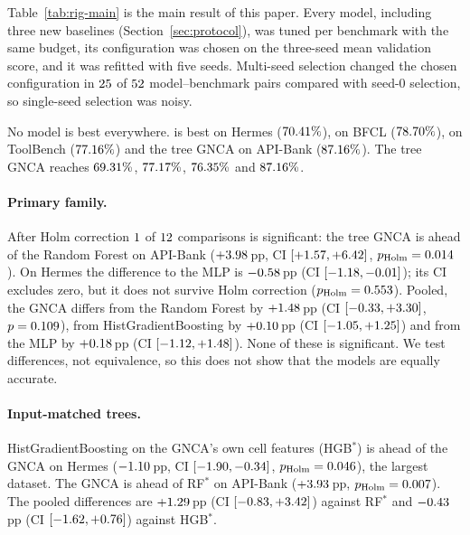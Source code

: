 \documentclass[10pt]{article}
\begin{document}
Table~\ref{tab:rig-main} is the main result of this paper. Every model, including three new baselines (Section~\ref{sec:protocol}), was tuned per benchmark with the same budget, its configuration was chosen on the three-seed mean validation score, and it was refitted with five seeds. Multi-seed selection changed the chosen configuration in $25$ of $52$ model--benchmark pairs compared with seed-0 selection, so single-seed selection was noisy.

No model is best everywhere. \numRHerBest{} is best on Hermes ($70.41\%$), \numRBfclBest{} on BFCL ($78.70\%$), \numRTbBest{} on ToolBench ($77.16\%$) and the tree GNCA on API-Bank ($87.16\%$). The tree GNCA reaches $69.31\%$, $77.17\%$, $76.35\%$ and $87.16\%$.

\paragraph{Primary family.} After Holm correction $1$ of $12$ comparisons is significant: the tree GNCA is ahead of the Random Forest on API-Bank ($+3.98$\,pp, CI $[+1.57, +6.42]$, $p_{\text{Holm}}=0.014$). On Hermes the difference to the MLP is $-0.58$\,pp (CI $[-1.18, -0.01]$); its CI excludes zero, but it does not survive Holm correction ($p_{\text{Holm}}=0.553$). Pooled, the GNCA differs from the Random Forest by $+1.48$\,pp (CI $[-0.33, +3.30]$, $p=0.109$), from HistGradientBoosting by $+0.10$\,pp (CI $[-1.05, +1.25]$) and from the MLP by $+0.18$\,pp (CI $[-1.12, +1.48]$). None of these is significant. We test differences, not equivalence, so this does not show that the models are equally accurate.

\paragraph{Input-matched trees.} HistGradientBoosting on the GNCA's own cell features (HGB$^\ast$) is ahead of the GNCA on Hermes ($-1.10$\,pp, CI $[-1.90, -0.34]$, $p_{\text{Holm}}=0.046$), the largest dataset. The GNCA is ahead of RF$^\ast$ on API-Bank ($+3.93$\,pp, $p_{\text{Holm}}=0.007$). The pooled differences are $+1.29$\,pp (CI $[-0.83, +3.42]$) against RF$^\ast$ and $-0.43$\,pp (CI $[-1.62, +0.76]$) against HGB$^\ast$.
\end{document}
